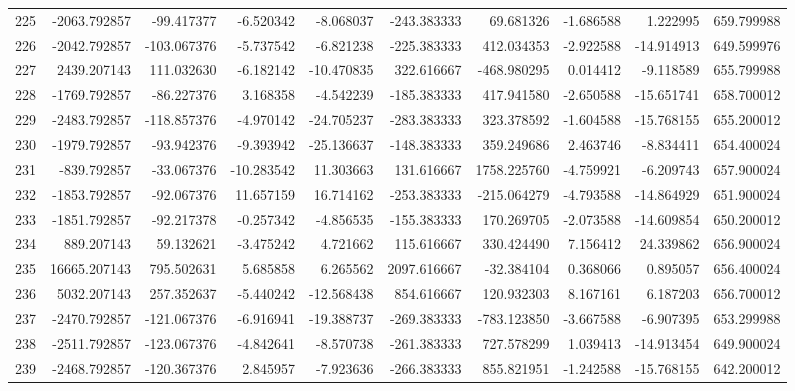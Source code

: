 \begin{tabular}{lrrrrrrrrr}
225 &  -2063.792857 &   -99.417377 &  -6.520342 &  -8.068037 &  -243.383333 &    69.681326 &  -1.686588 &   1.222995 &  659.799988 \\
226 &  -2042.792857 &  -103.067376 &  -5.737542 &  -6.821238 &  -225.383333 &   412.034353 &  -2.922588 & -14.914913 &  649.599976 \\
227 &   2439.207143 &   111.032630 &  -6.182142 & -10.470835 &   322.616667 &  -468.980295 &   0.014412 &  -9.118589 &  655.799988 \\
228 &  -1769.792857 &   -86.227376 &   3.168358 &  -4.542239 &  -185.383333 &   417.941580 &  -2.650588 & -15.651741 &  658.700012 \\
229 &  -2483.792857 &  -118.857376 &  -4.970142 & -24.705237 &  -283.383333 &   323.378592 &  -1.604588 & -15.768155 &  655.200012 \\
230 &  -1979.792857 &   -93.942376 &  -9.393942 & -25.136637 &  -148.383333 &   359.249686 &   2.463746 &  -8.834411 &  654.400024 \\
231 &   -839.792857 &   -33.067376 & -10.283542 &  11.303663 &   131.616667 &  1758.225760 &  -4.759921 &  -6.209743 &  657.900024 \\
232 &  -1853.792857 &   -92.067376 &  11.657159 &  16.714162 &  -253.383333 &  -215.064279 &  -4.793588 & -14.864929 &  651.900024 \\
233 &  -1851.792857 &   -92.217378 &  -0.257342 &  -4.856535 &  -155.383333 &   170.269705 &  -2.073588 & -14.609854 &  650.200012 \\
234 &    889.207143 &    59.132621 &  -3.475242 &   4.721662 &   115.616667 &   330.424490 &   7.156412 &  24.339862 &  656.900024 \\
235 &  16665.207143 &   795.502631 &   5.685858 &   6.265562 &  2097.616667 &   -32.384104 &   0.368066 &   0.895057 &  656.400024 \\
236 &   5032.207143 &   257.352637 &  -5.440242 & -12.568438 &   854.616667 &   120.932303 &   8.167161 &   6.187203 &  656.700012 \\
237 &  -2470.792857 &  -121.067376 &  -6.916941 & -19.388737 &  -269.383333 &  -783.123850 &  -3.667588 &  -6.907395 &  653.299988 \\
238 &  -2511.792857 &  -123.067376 &  -4.842641 &  -8.570738 &  -261.383333 &   727.578299 &   1.039413 & -14.913454 &  649.900024 \\
239 &  -2468.792857 &  -120.367376 &   2.845957 &  -7.923636 &  -266.383333 &   855.821951 &  -1.242588 & -15.768155 &  642.200012 \\

\end{tabular}
